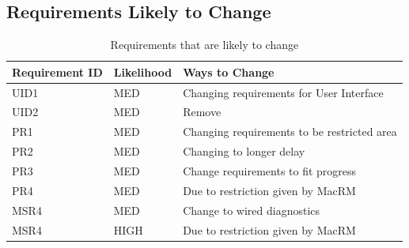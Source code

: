 \documentclass[12pt]{article}
\begin{document}
\subsection{Requirements Likely to Change}
\begin{table}[H]
    \begin{tabular}{|p{}|p{}|p{}|}

        \hline Requirement ID & Likelihood & Ways to Change                              \\
        \hline  UID1          & MED        & Changing requirements for User Interface    \\
        \hline  UID2          & MED        & Remove                                      \\
        \hline  PR1           & MED        & Changing requirements to be restricted area \\
        \hline  PR2           & MED        & Changing to longer delay                    \\
        \hline  PR3           & MED        & Change requirements to fit progress         \\
        \hline  PR4           & MED        & Due to restriction given by MacRM           \\
        \hline  MSR4          & MED        & Change to wired diagnostics                 \\
        \hline  MSR4          & HIGH       & Due to restriction given by MacRM           \\


        \hline
    \end{tabular}
    \caption{Requirements that are likely to change}
\end{table}
\end{document}
